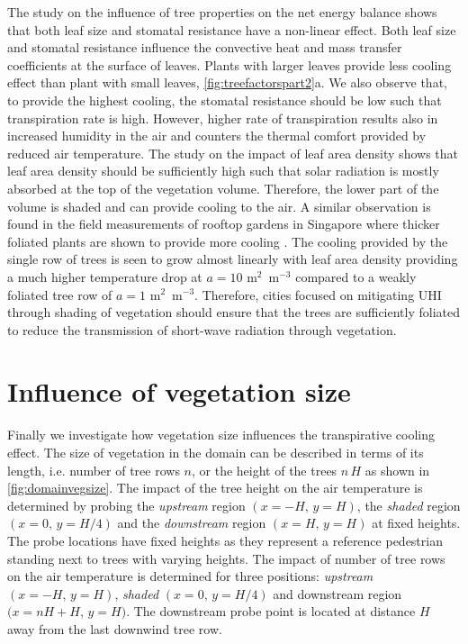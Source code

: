 The study on the influence of tree properties on the net energy balance shows that both leaf size and stomatal resistance have a non-linear effect. Both leaf size and stomatal resistance influence the convective heat and mass transfer coefficients at the surface of leaves. Plants with larger leaves provide less cooling effect than plant with small leaves, \cref{fig:treefactorspart2}a. We also observe that, to provide the highest cooling, the stomatal resistance should be low such that transpiration rate is high. However, higher rate of transpiration results also in increased humidity in the air and counters the thermal comfort provided by reduced air temperature. The study on the impact of leaf area density shows that leaf area density should be sufficiently high such that solar radiation is mostly absorbed at the top of the vegetation volume. Therefore, the lower part of the volume is shaded and can provide cooling to the air. A similar observation is found in the field measurements of rooftop gardens in Singapore where thicker foliated plants are shown to provide more cooling \citep{Wong2003}. The cooling provided by the single row of trees is seen to grow almost linearly with leaf area density providing a much higher temperature drop at $a=10$ m$^2$~m$^{-3}$ compared to a weakly foliated tree row of $a=1$ m$^2$~m$^{-3}$. Therefore, cities focused on mitigating UHI through shading of vegetation should ensure that the trees are sufficiently foliated to reduce the transmission of short-wave radiation through vegetation. 

\section{Influence of vegetation size}

Finally we investigate how vegetation size influences the transpirative cooling effect. The size of vegetation in the domain can be described in terms of its length, i.e. number of tree rows $n$, or the height of the trees $n\,H$ as shown in \cref{fig:domainvegsize}. The impact of the tree height on the air temperature is determined by probing the \textit{upstream} region $\left(x = -H,\, y = H\right)$, the \textit{shaded} region $\left(x = 0,\, y = H/4\right)$ and the \textit{downstream} region $\left(x=H,\, y=H \right)$ at fixed heights. The probe locations have fixed heights as they represent a reference pedestrian standing next to trees with varying heights. The impact of number of tree rows on the air temperature is determined for three positions: \textit{upstream} $\left(x=-H,\, y=H \right)$, \textit{shaded} $\left(x=0,\, y=H/4 \right)$ and downstream region $( x= nH+H$, $y=H)$. The downstream probe point is located at distance $H$ away from the last downwind tree row.

